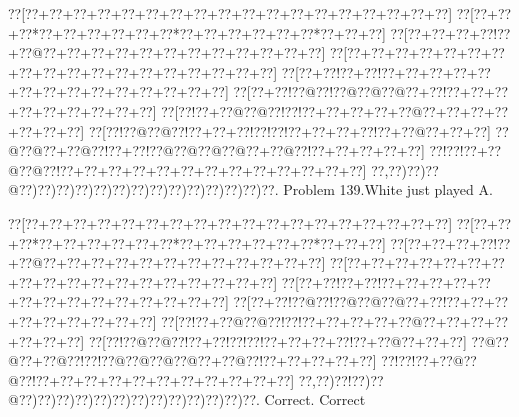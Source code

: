 \documentclass[a5paper]{article}
\begin{document}
\newpage
\begin{center}
{\goo
\0??[\0??+\0??+\0??+\0??+\0??+\0??+\0??+\0??+\0??+\0??+\0??+\0??+\0??+\0??+\0??+\0??+\0??+\0??]
\0??[\0??+\0??+\0??*\0??+\0??+\0??+\0??+\0??+\0??*\0??+\0??+\0??+\0??+\0??+\0??*\0??+\0??+\0??]
\0??[\0??+\0??+\0??+\0??!\0??+\0??@\0??+\0??+\0??+\0??+\0??+\0??+\0??+\0??+\0??+\0??+\0??+\0??]
\0??[\0??+\0??+\0??+\0??+\0??+\0??+\0??+\0??+\0??+\0??+\0??+\0??+\0??+\0??+\0??+\0??+\0??+\0??]
\0??[\0??+\0??!\0??+\0??!\0??+\0??+\0??+\0??+\0??+\0??+\0??+\0??+\0??+\0??+\0??+\0??+\0??+\0??]
\0??[\0??+\0??!\0??@\0??!\0??@\0??@\0??@\0??+\0??!\0??+\0??+\0??+\0??+\0??+\0??+\0??+\0??+\0??]
\0??[\0??!\0??+\0??@\0??@\0??!\0??!\0??+\0??+\0??+\0??+\0??@\0??+\0??+\0??+\0??+\0??+\0??+\0??]
\0??[\0??!\0??@\0??@\0??!\0??+\0??+\0??!\0??!\0??!\0??+\0??+\0??+\0??!\0??+\0??@\0??+\0??+\0??]
\0??@\0??@\0??+\0??@\0??!\0??+\0??!\0??@\0??@\0??@\0??@\0??+\0??@\0??!\0??+\0??+\0??+\0??+\0??]
\0??!\0??!\0??+\0??@\0??@\0??!\0??+\0??+\0??+\0??+\0??+\0??+\0??+\0??+\0??+\0??+\0??+\0??+\0??]
\0??,\0??)\0??)\0??@\0??)\0??)\0??)\0??)\0??)\0??)\0??)\0??)\0??)\0??)\0??)\0??)\0??)\0??.
}
Problem 139.White just played A.

\end{center}
\begin{center}
{\goo
\0??[\0??+\0??+\0??+\0??+\0??+\0??+\0??+\0??+\0??+\0??+\0??+\0??+\0??+\0??+\0??+\0??+\0??+\0??]
\0??[\0??+\0??+\0??*\0??+\0??+\0??+\0??+\0??+\0??*\0??+\0??+\0??+\0??+\0??+\0??*\0??+\0??+\0??]
\0??[\0??+\0??+\0??+\0??!\0??+\0??@\0??+\0??+\0??+\0??+\0??+\0??+\0??+\0??+\0??+\0??+\0??+\0??]
\0??[\0??+\0??+\0??+\0??+\0??+\0??+\0??+\0??+\0??+\0??+\0??+\0??+\0??+\0??+\0??+\0??+\0??+\0??]
\0??[\0??+\0??!\0??+\0??!\0??+\0??+\0??+\0??+\0??+\0??+\0??+\0??+\0??+\0??+\0??+\0??+\0??+\0??]
\0??[\0??+\0??!\0??@\0??!\0??@\0??@\0??@\0??+\0??!\0??+\0??+\0??+\0??+\0??+\0??+\0??+\0??+\0??]
\0??[\0??!\0??+\0??@\0??@\0??!\0??!\0??+\0??+\0??+\0??+\0??@\0??+\0??+\0??+\0??+\0??+\0??+\0??]
\0??[\0??!\0??@\0??@\0??!\0??+\0??!\0??!\0??!\0??+\0??+\0??+\0??!\0??+\0??@\0??+\0??+\0??]
\0??@\0??@\0??+\0??@\0??!\0??!\0??@\0??@\0??@\0??@\0??+\0??@\0??!\0??+\0??+\0??+\0??+\0??]
\0??!\0??!\0??+\0??@\0??@\0??!\0??+\0??+\0??+\0??+\0??+\0??+\0??+\0??+\0??+\0??+\0??]
\0??,\0??)\0??!\0??)\0??@\0??)\0??)\0??)\0??)\0??)\0??)\0??)\0??)\0??)\0??)\0??)\0??)\0??.
}
Correct. Correct

\end{center}
\end{document}
